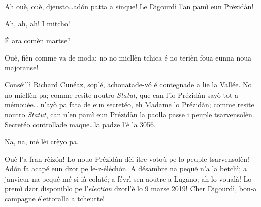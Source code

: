 \begin{drama}
\Secreteospeaks  {} Ah ouè, ouè, djeusto\ldots ad\'on patta a sinque! Le Digourdì l’an pamì eun Prézidàn!

\Cimaspeaks Ah, ah, ah! I mitcho!

\Eyviaspeaks \'E ara comèn martse?

\Richardspeaks Ouè, fièn comme va de moda: no no micllèn tchica é no terièn foua eunna noua majoranse!

\Jordyspeaks Conséillì Richard Cunéaz, soplé, achouatade-v\'o é contegnade a lie la Vallée. No no micllèn pa; comme resite noutro \textit{Statut}, que can l'io Prézidàn sayò tot a mémouée\ldots {} n'ayò pa fata de eun secretéo, eh Madame lo Prézidàn; comme resite noutro \textit{Statut}, can n'en pamì eun Prézidàn la paolla passe i peuple tsarvensolèn. Secretéo controllade maque\ldots la padze l'è la 3056.

\Secreteospeaks Na, na, mé lèi crèyo pa.


\Secreteospeaks Ouè l'a fran rèiz\'on! Lo nouo Prézidàn dèi itre votoù pe lo peuple tsarvensolèn! Ad\'on fa acapé eun dzor pe le-z-éléch\'on.  A désambre na pequé n'a la betchì; a janvieur na pequé mé si ià colaté; a févrì sen aoutre a Lugano; ah lo voualà! Lo premì dzor disponiblo pe \og l’\textit{election} dzor\fg l’è lo 9 marse 2019! Cher Digourdì, bon-a campagne élettoralla a tcheutte!






\end{drama}
